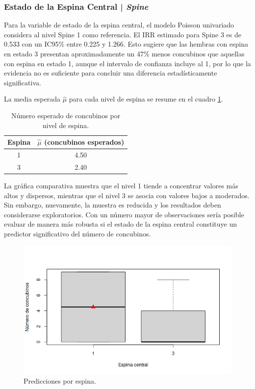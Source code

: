 \subsubsection{Estado de la Espina Central | \textit{Spine}}

Para la variable de estado de la espina central, el modelo Poisson univariado considera al nivel Spine 1
como referencia. El IRR estimado para Spine 3 es de 0.533 con un IC95\% entre 0.225 y 1.266. Esto sugiere
que las hembras con espina en estado 3 presentan aproximadamente un 47\% menos concubinos que aquellas con
espina en estado 1, aunque el intervalo de confianza incluye al 1, por lo que la evidencia no es suficiente
para concluir una diferencia estadísticamente significativa.

La media esperada $\hat{\mu}$ para cada nivel de espina se resume en el cuadro \ref{tab:spine-concubinos}.

\begin{table}[h!]
    \centering
    \begin{tabular}{|c|c|}
        \hline
        \textbf{Espina} & \textbf{$\hat{\mu}$ (concubinos esperados)} \\
        \hline
        1 & 4.50 \\
        \hline
        3 & 2.40 \\
        \hline
    \end{tabular}
    \caption{Número esperado de concubinos por nivel de espina.}
    \label{tab:spine-concubinos}
\end{table}

La gráfica comparativa muestra que el nivel 1 tiende a concentrar valores más altos y dispersos, mientras
que el nivel 3 se asocia con valores bajos a moderados. Sin embargo, nuevamente, la muestra es reducida y
los resultados deben considerarse exploratorios. Con un número mayor de observaciones sería posible evaluar
de manera más robusta si el estado de la espina central constituye un predictor significativo del número de
concubinos.

\begin{figure}[h!]
    \centering
    \includegraphics[width=0.7\linewidth]{Images/espina-capa.png}
    \caption{Predicciones por espina.}
    \label{fig:espina-capa}
\end{figure}

